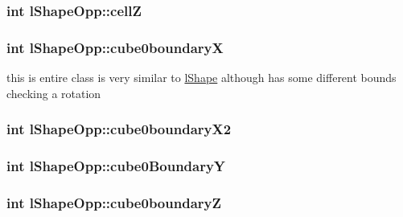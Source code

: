 \hypertarget{classl_shape_opp_a3d1c6dfb9ca0b54c9a44f12adbc52186}{
\subsubsection[{cell\-Z}]{\setlength{\rightskip}{0pt plus 5cm}int l\-Shape\-Opp\-::cell\-Z}}\label{classl_shape_opp_a3d1c6dfb9ca0b54c9a44f12adbc52186}
\hypertarget{classl_shape_opp_a8604c36ae3e6b6f6db19fbbb590f46ba}{
\subsubsection[{cube0boundary\-X}]{\setlength{\rightskip}{0pt plus 5cm}int l\-Shape\-Opp\-::cube0boundary\-X}}\label{classl_shape_opp_a8604c36ae3e6b6f6db19fbbb590f46ba}
this is entire class is very similar to \hyperlink{classl_shape}{l\-Shape} although has some different bounds checking a rotation \hypertarget{classl_shape_opp_a1584503f7aac34030f0008baac89927e}{
\subsubsection[{cube0boundary\-X2}]{\setlength{\rightskip}{0pt plus 5cm}int l\-Shape\-Opp\-::cube0boundary\-X2}}\label{classl_shape_opp_a1584503f7aac34030f0008baac89927e}
\hypertarget{classl_shape_opp_a4314bc7ac701a665eb73b397b9f883bd}{
\subsubsection[{cube0\-Boundary\-Y}]{\setlength{\rightskip}{0pt plus 5cm}int l\-Shape\-Opp\-::cube0\-Boundary\-Y}}\label{classl_shape_opp_a4314bc7ac701a665eb73b397b9f883bd}
\hypertarget{classl_shape_opp_a270c01126b5374b2898aec1e8422a427}{
\subsubsection[{cube0boundary\-Z}]{\setlength{\rightskip}{0pt plus 5cm}int l\-Shape\-Opp\-::cube0boundary\-Z}}\label{classl_shape_opp_a270c01126b5374b2898aec1e8422a427}
